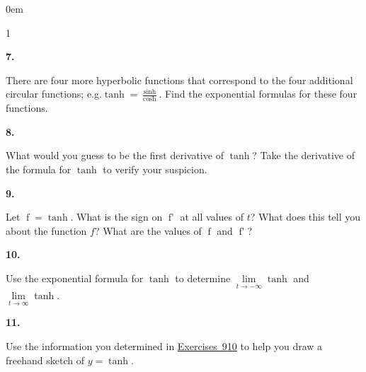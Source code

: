 \documentclass[12pt,]{book}
\theoremstyle{plain}
\theoremstyle{definition}
\numberwithin{equation}{section}
\newenvironment{exercisegroup}%
{\medskip\noindent}%
{\par\bigskip}%
\newlength{\exercisegroupindent}%
\newlength{\exercisegroupitemwidth}%
\newenvironment{exercisegrouplist}%
{\vspace{-\partopsep}%
\begin{adjustwidth}{\exercisegroupindent}{0em}}%
{\end{adjustwidth}%
\vspace{-\partopsep}%
\vspace{\baselineskip}}%
\newenvironment{exercisegroupbycol}[1]%
{\begin{exercisegrouplist}%
\vspace{-\multicolsep}%
\begin{multicols}{#1}%
\setlength{\parindent}{0em}%
\setlength{\exercisegroupitemwidth}{\linewidth}}%
{\end{multicols}%
\vspace{-\multicolsep}%
\end{exercisegrouplist}}%
\newenvironment{exercisegroupitem}[1]%
{\begin{minipage}[t]{\exercisegroupitemwidth}
\vspace{0pt}%
{\bfseries#1}%
\rule{0pt}{\baselineskip}}{\strut%
\end{minipage}%
\hspace{\columnsep}}%
\providecommand\phantomsection{}
\newcommand{\fe}[2]{\mathop{{#1}{\left(#2\right)}}}
\newcommand{\fd}[1]{#1'}
\begin{document}
\begin{exercisegroup}
\begin{exercisegroupbycol}{1}
\begin{exercisegroupitem}{7. }\phantomsection\hypertarget{exercise-76}{\null}
There are four more hyperbolic functions that correspond to the four additional circular functions; e.g.\@ \(\fe{\tanh}{t}=\frac{\fe{\sinh}{t}}{\fe{\cosh}{t}}\).  Find the exponential formulas for these four functions.%
\end{exercisegroupitem}%
\par%
\begin{exercisegroupitem}{8. }\phantomsection\hypertarget{exercise-77}{\null}
What would you guess to be the first derivative of \(\fe{\tanh}{t}\)?  Take the derivative of the formula for \(\fe{\tanh}{t}\) to verify your suspicion.%
\end{exercisegroupitem}%
\par%
\begin{exercisegroupitem}{9. }\phantomsection\hypertarget{exercise-tanh-behavior}{\null}
Let \(\fe{f}{t}=\fe{\tanh}{t}\). What is the sign on \(\fe{\fd{f}}{t}\) at all values of \(t\)?  What does this tell you about the function \(f\)?  What are the values of \(\fe{f}{0}\) and \(\fe{\fd{f}}{0}\)?%
\end{exercisegroupitem}%
\par%
\begin{exercisegroupitem}{10. }\phantomsection\hypertarget{exercise-tanh-limits}{\null}
Use the exponential formula for \(\tanh\) to determine \(\lim\limits_{t\to-\infty}\fe{\tanh}{t}\) and \(\lim\limits_{t\to\infty}\fe{\tanh}{t}\).%
\end{exercisegroupitem}%
\par%
\begin{exercisegroupitem}{11. }\phantomsection\hypertarget{exercise-80}{\null}
Use the information you determined in \hyperref[exercise-tanh-behavior]{Exercises~9}\textendash{}\hyperref[exercise-tanh-limits]{10} to help you draw a freehand sketch of \(y=\fe{\tanh}{t}\).%
\end{exercisegroupitem}%
\par%
\end{exercisegroupbycol}%
\end{exercisegroup}%
\end{document}
